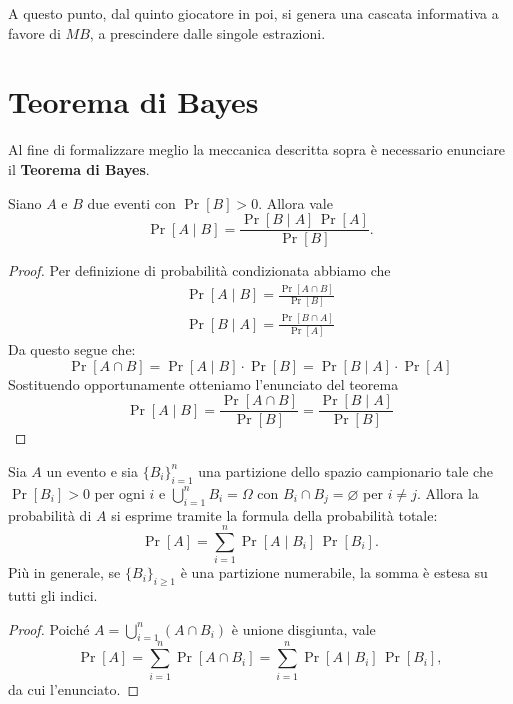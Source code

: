 A questo punto, dal quinto giocatore in poi, si genera una cascata informativa a favore di $MB$, a prescindere dalle singole estrazioni.

\section{Teorema di Bayes}

Al fine di formalizzare meglio la meccanica descritta sopra è necessario enunciare il \textbf{Teorema di Bayes}.

\begin{teorema}[di Bayes]
    Siano \(A\) e \(B\) due eventi con \(\Pr[B]>0\). Allora vale
    \[
    \Pr[A\mid B]=\frac{\Pr[B\mid A]\,\Pr[A]}{\Pr[B]}.
    \]
\end{teorema}

\begin{proof}
    Per definizione di probabilità condizionata abbiamo che
    \begin{align*}
        \Pr[A \mid B] = \frac{\Pr[A \cap B]}{\Pr[B]} \\
        \Pr[B \mid A] = \frac{\Pr[B \cap A]}{\Pr[A]}
    \end{align*}
    Da questo segue che:
    \[
        \Pr[A \cap B] = \Pr[A \mid B] \cdot \Pr[B] = \Pr[B \mid A] \cdot \Pr[A]
    \]
    Sostituendo opportunamente otteniamo l'enunciato del teorema
    \[
        \Pr[A \mid B] = \frac{\Pr[A \cap B]}{\Pr[B]} = \frac{\Pr[B \mid A]}{\Pr[B]} 
    \]
\end{proof}

\begin{definizione}
    Sia \(A\) un evento e sia \(\{B_i\}_{i=1}^n\) una partizione dello spazio campionario tale che \(\Pr[B_i]>0\) per ogni \(i\) e \(\bigcup_{i=1}^n B_i=\Omega\) con \(B_i\cap B_j=\varnothing\) per \(i\neq j\). Allora la probabilità di \(A\) si esprime tramite la formula della probabilità totale:
    \[
        \Pr[A]=\sum_{i=1}^n \Pr[A\mid B_i]\,\Pr[B_i].
    \]
    Più in generale, se \(\{B_i\}_{i\ge1}\) è una partizione numerabile, la somma è estesa su tutti gli indici.
    
    \begin{proof}
        Poiché \(A=\bigcup_{i=1}^n (A\cap B_i)\) è unione disgiunta, vale
        \[
            \Pr[A]=\sum_{i=1}^n \Pr[A\cap B_i]=\sum_{i=1}^n \Pr[A\mid B_i]\,\Pr[B_i],
        \]
        da cui l'enunciato.
    \end{proof}
\end{definizione}

